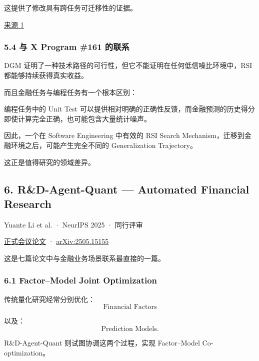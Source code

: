 这提供了修改具有跨任务可迁移性的证据。

\href{https://arxiv.org/html/2505.22954}{来源 1}

\hypertarget{part-3-44-0001-ux4e0e-x-program-161-ux7684ux8054ux7cfb}{%
\subsubsection{5.4 与 X Program \#161 的联系}\label{part-3-44-0001-ux4e0e-x-program-161-ux7684ux8054ux7cfb}}

DGM 证明了一种技术路径的可行性，但它不能证明在任何低信噪比环境中，RSI 都能够持续获得真实收益。

而且金融任务与编程任务有一个根本区别：

编程任务中的 Unit Test 可以提供相对明确的正确性反馈，而金融预测的历史得分即使计算完全正确，也可能包含大量统计噪声。

因此，一个在 Software Engineering 中有效的 RSI Search Mechanism，迁移到金融环境之后，可能产生完全不同的 Generalization Trajectory。

这正是值得研究的领域差异。

\hypertarget{part-3-44-0001-rd-agent-quant-automated-financial-research}{%
\subsection{6. R\&D-Agent-Quant --- Automated Financial Research}\label{part-3-44-0001-rd-agent-quant-automated-financial-research}}

Yuante Li et al. · NeurIPS 2025 · 同行评审

\href{https://proceedings.neurips.cc/paper_files/paper/2025/hash/ac5c2b6e423883cbcacbcccf88491b78-Abstract-Datasets_and_Benchmarks_Track.html}{正式会议论文} · \href{https://arxiv.org/abs/2505.15155}{arXiv:2505.15155}

这是七篇论文中与金融业务场景联系最直接的一篇。

\hypertarget{part-3-44-0001-factormodel-joint-optimization}{%
\subsubsection{6.1 Factor--Model Joint Optimization}\label{part-3-44-0001-factormodel-joint-optimization}}

传统量化研究经常分别优化：
\[\text{Financial Factors}\]

以及：
\[\text{Prediction Models}.\]

R\&D-Agent-Quant 则试图协调这两个过程，实现 Factor--Model Co-optimization。

